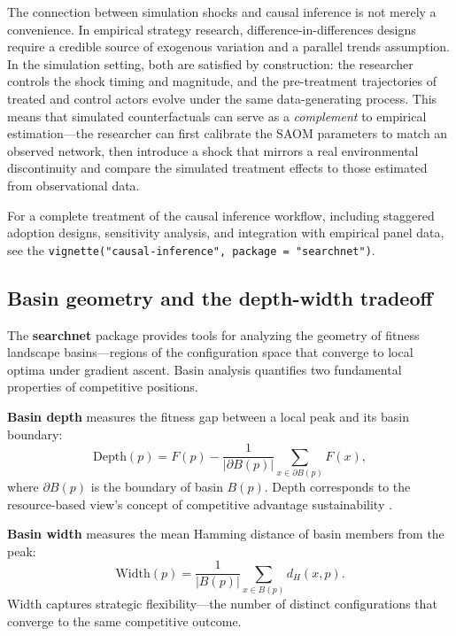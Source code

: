 \documentclass[
]{article}
\begin{document}
The connection between simulation shocks and causal inference is not
merely a convenience. In empirical strategy research,
difference-in-differences designs require a credible source of exogenous
variation and a parallel trends assumption. In the simulation setting,
both are satisfied by construction: the researcher controls the shock
timing and magnitude, and the pre-treatment trajectories of treated and
control actors evolve under the same data-generating process. This means
that simulated counterfactuals can serve as a \emph{complement} to
empirical estimation---the researcher can first calibrate the SAOM
parameters to match an observed network, then introduce a shock that
mirrors a real environmental discontinuity and compare the simulated
treatment effects to those estimated from observational data.

For a complete treatment of the causal inference workflow, including
staggered adoption designs, sensitivity analysis, and integration with
empirical panel data, see the
\texttt{vignette("causal-inference", package = "searchnet")}.

\subsection{Basin geometry and the depth-width
tradeoff}\label{sec:basins}

The \textbf{searchnet} package provides tools for analyzing the geometry
of fitness landscape basins---regions of the configuration space that
converge to local optima under gradient ascent. Basin analysis
quantifies two fundamental properties of competitive positions.

\textbf{Basin depth} measures the fitness gap between a local peak and
its basin boundary: \begin{equation}\label{eq:basin-depth}
  \text{Depth}(p) = F(p) - \frac{1}{|\partial B(p)|} \sum_{x \in \partial B(p)} F(x),
\end{equation} where \(\partial B(p)\) is the boundary of basin
\(B(p)\). Depth corresponds to the resource-based view's concept of
competitive advantage sustainability \citep{barney1991firm}.

\textbf{Basin width} measures the mean Hamming distance of basin members
from the peak: \begin{equation}\label{eq:basin-width}
  \text{Width}(p) = \frac{1}{|B(p)|} \sum_{x \in B(p)} d_H(x, p).
\end{equation} Width captures strategic flexibility---the number of
distinct configurations that converge to the same competitive outcome.
\end{document}
